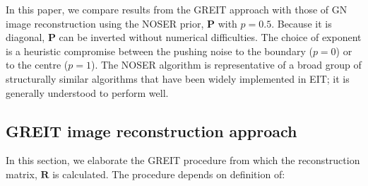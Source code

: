 \documentclass[12pt]{iopart}
\newcommand{\RB}{\mbox{$\mathbf{R}$}}
\renewcommand{\PB}{\mbox{$\mathbf{P}$}}
\begin{document}
In this paper, we compare results from the GREIT approach
with those of GN image reconstruction using the NOSER prior,
$\PB$ with $p=0.5$.
Because it is diagonal, $\PB$ can be
inverted without numerical difficulties. The choice of exponent is
a heuristic compromise between the pushing noise to the boundary
($p=0$) or to the centre ($p=1$). The NOSER algorithm is 
representative of a broad group of structurally similar 
algorithms that have been widely implemented in EIT;
it is generally understood to perform well.


\subsection{GREIT image reconstruction approach}

In this section, we elaborate the GREIT procedure
from which the reconstruction matrix, $\RB$ is
calculated.  The procedure depends on definition
of:
\end{document}
